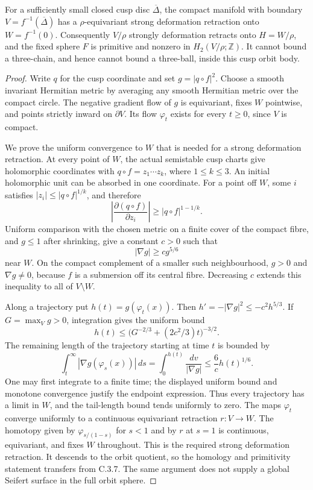 \begin{lemma}
For a sufficiently small closed cusp disc \(\overline\Delta\),
the compact manifold with boundary
\(V=f^{-1}(\overline\Delta)\) has a \(\rho\)-equivariant strong
deformation retraction onto \(W=f^{-1}(0)\). Consequently
\(V/\rho\) strongly deformation retracts onto \(H=W/\rho\),
and the fixed sphere \(F\) is primitive and nonzero in
\(H_2(V/\rho;\mathbb Z)\). It cannot bound a three-chain,
and hence cannot bound a three-ball, inside this cusp orbit body.
\end{lemma}
\begin{proof}
Write \(q\) for the cusp coordinate and set \(g=|q\circ f|^2\).
Choose a smooth invariant Hermitian metric by averaging any smooth
Hermitian metric over the compact circle. The negative gradient
flow of \(g\) is equivariant, fixes \(W\) pointwise, and points
strictly inward on \(\partial V\). Its flow \(\varphi_t\) exists
for every \(t\geq0\), since \(V\) is compact.

We prove the uniform convergence to \(W\) that is needed for a
strong deformation retraction. At every point of \(W\), the
actual semistable cusp charts give holomorphic coordinates with
\(q\circ f=z_1\cdots z_k\), where \(1\leq k\leq3\).
An initial holomorphic unit can be absorbed in one coordinate.
For a point off \(W\), some \(i\) satisfies
\( |z_i|\leq|q\circ f|^{1/k}\), and therefore
\[
 \left|\frac{\partial(q\circ f)}{\partial z_i}\right|
       \geq |q\circ f|^{1-1/k}.
\]
Uniform comparison with the chosen metric on a finite cover of
the compact fibre, and \(g\leq1\) after shrinking, give a
constant \(c>0\) such that
\[
 |\nabla g|\geq c g^{5/6}
\]
near \(W\). On the compact complement of a smaller such
neighbourhood, \(g>0\) and \(\nabla g\ne0\), because
\(f\) is a submersion off its central fibre. Decreasing \(c\)
extends this inequality to all of \(V\setminus W\).

Along a trajectory put \(h(t)=g(\varphi_t(x))\). Then
\(h'=-|\nabla g|^2\leq-c^2h^{5/3}\). If
\(G=\max_V g>0\), integration gives the uniform bound
\[
 h(t)\leq\bigl(G^{-2/3}+(2c^2/3)t\bigr)^{-3/2}.
\]
The remaining length of the trajectory starting at time \(t\)
is bounded by
\[
 \int_t^\infty|\nabla g(\varphi_s(x))|\,ds
 =\int_0^{h(t)}\frac{dv}{|\nabla g|}
 \leq\frac6c h(t)^{1/6}.
\]
One may first integrate to a finite time; the displayed uniform
bound and monotone convergence justify the endpoint expression.
Thus every trajectory has a limit in \(W\), and the tail-length
bound tends uniformly to zero. The maps \(\varphi_t\) converge
uniformly to a continuous equivariant retraction \(r:V\to W\).
The homotopy given by \(\varphi_{s/(1-s)}\) for \(s<1\)
and by \(r\) at \(s=1\) is continuous, equivariant, and fixes
\(W\) throughout. This is the required strong deformation
retraction. It descends to the orbit quotient, so the homology
and primitivity statement transfers from C.3.7. The same argument
does not supply a global Seifert surface in the full orbit sphere.
\end{proof}

